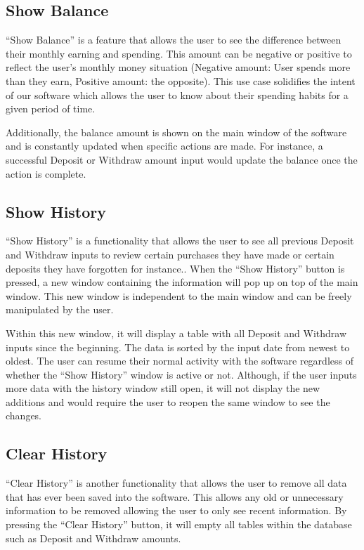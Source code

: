 \documentclass[12pt]{article}
\begin{document}
\subsection{Show Balance} 
“Show Balance” is a feature that allows the user to see the difference between their monthly earning and spending. This amount can be negative or positive to reflect the user’s monthly money situation (Negative amount: User spends more than they earn, Positive amount: the opposite). This use case solidifies the intent of our software which allows the user to know about their spending habits for a given period of time.

Additionally, the balance amount is shown on the main window of the software and is constantly updated when specific actions are made. For instance, a successful Deposit or Withdraw amount input would update the balance once the action is complete. 


\subsection{Show History} 
“Show History” is a functionality that allows the user to see all previous Deposit and Withdraw inputs to review certain purchases they have made or certain deposits they have forgotten for instance.. When the “Show History” button is pressed, a new window containing the information will pop up on top of the main window. This new window is independent to the main window and can be freely manipulated by the user. 

Within this new window, it will display a table with all Deposit and Withdraw inputs since the beginning. The data is sorted by the input date from newest to oldest. The user can resume their normal activity with the software regardless of whether the “Show History” window is active or not. Although, if the user inputs more data with the history window still open, it will not display the new additions and would require the user to reopen the same window to see the changes.


\subsection{Clear History}
“Clear History” is another functionality that allows the user to remove all data that has ever been saved into the software. This allows any old or unnecessary information to be removed allowing the user to only see recent information. By pressing the “Clear History” button, it will empty all tables within the database such as Deposit and Withdraw amounts.
\end{document}
